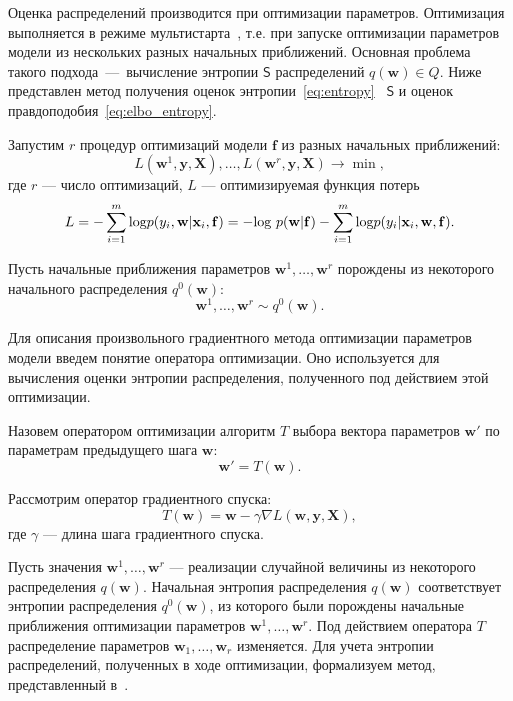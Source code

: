 Оценка распределений производится при оптимизации параметров. Оптимизация выполняется в режиме мультистарта~\cite{multi}, т.е. при запуске оптимизации параметров модели из нескольких разных начальных приближений. Основная проблема такого подхода~---~вычисление энтропии $\mathsf{S}$ распределений $q(\mathbf{w}) \in Q$. Ниже представлен метод получения оценок энтропии~\eqref{eq:entropy} ~$\mathsf{S}$ и оценок правдоподобия~\eqref{eq:elbo_entropy}.

Запустим $r$ процедур оптимизаций модели $\mathbf{f}$ из разных начальных приближений:
\[
	L(\mathbf{w}^1, \mathbf{y}, \mathbf{X}), \dots, L(\mathbf{w}^r, \mathbf{y}, \mathbf{X}) \to \min,
\] 
где $r$ --- число оптимизаций, $L$ --- оптимизируемая функция потерь
\begin{equation}
\label{eq:loss_func}
L = -\sum_{i=1}^m \textnormal{log}p({y}_i, \mathbf{w} |\mathbf{x}_i, \mathbf{f}) = -\textnormal{log}~p(\mathbf{w}|\mathbf{f}) - \sum_{i=1}^m \textnormal{log}p({y}_i |\mathbf{x}_i, \mathbf{w}, \mathbf{f}).
\end{equation}

Пусть начальные приближения параметров $\mathbf{w}^1, \dots, \mathbf{w}^r$ порождены из некоторого начального распределения $q^0(\mathbf{w})$:
\[
	\mathbf{w}^1, \dots, \mathbf{w}^r \sim q^0(\mathbf{w}). 
\]


Для описания произвольного градиентного метода оптимизации параметров модели введем понятие оператора оптимизации. Оно используется для вычисления оценки энтропии распределения, полученного под действием этой оптимизации.

Назовем оператором оптимизации алгоритм $T$ выбора вектора параметров $\mathbf{w}'$  по параметрам предыдущего шага $\mathbf{w}$:
\[
	\mathbf{w}' = T(\mathbf{w}).
\]


Рассмотрим оператор градиентного спуска:
\begin{equation}
\label{eq:sgd}
	T(\mathbf{w}) = \mathbf{w} - \gamma \nabla L(\mathbf{w}, \mathbf{y}, \mathbf{X}), 
\end{equation}
где  $\gamma$ --- длина шага градиентного спуска.

Пусть значения $\mathbf{w}^1, \dots, \mathbf{w}^r$  --- реализации случайной величины из некоторого распределения $q(\mathbf{w})$. Начальная энтропия распределения $q(\mathbf{w})$ соответствует энтропии распределения $q^0(\mathbf{w})$, из которого были порождены начальные приближения оптимизации параметров $\mathbf{w}^1, \dots, \mathbf{w}^r$. Под действием оператора $T$ распределение параметров $\mathbf{w}_1, \dots, \mathbf{w}_r$ изменяется. Для учета энтропии распределений, полученных в ходе оптимизации,
{ формализуем метод,  представленный в~\cite{early}. }

